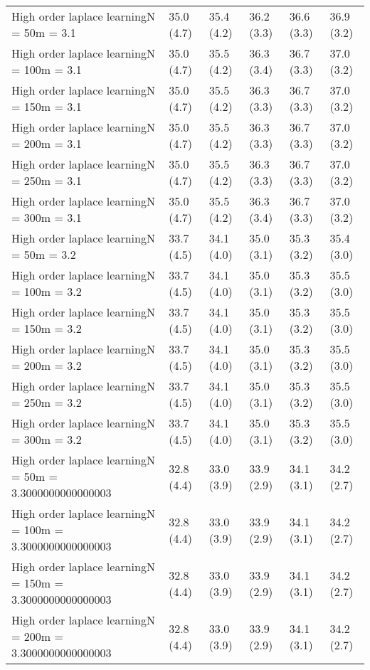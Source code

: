 \documentclass{article}
\begin{document}
\begin{table*}[t!]
\begin{center}
\begin{small}
\begin{sc}
\begin{tabular}{llllll}
High order laplace learningN = 50m = 3.1&35.0 (4.7)      &35.4 (4.2)      &36.2 (3.3)      &36.6 (3.3)      &36.9 (3.2)      \\
High order laplace learningN = 100m = 3.1&35.0 (4.7)      &35.5 (4.2)      &36.3 (3.4)      &36.7 (3.3)      &37.0 (3.2)      \\
High order laplace learningN = 150m = 3.1&35.0 (4.7)      &35.5 (4.2)      &36.3 (3.3)      &36.7 (3.3)      &37.0 (3.2)      \\
High order laplace learningN = 200m = 3.1&35.0 (4.7)      &35.5 (4.2)      &36.3 (3.3)      &36.7 (3.3)      &37.0 (3.2)      \\
High order laplace learningN = 250m = 3.1&35.0 (4.7)      &35.5 (4.2)      &36.3 (3.3)      &36.7 (3.3)      &37.0 (3.2)      \\
High order laplace learningN = 300m = 3.1&35.0 (4.7)      &35.5 (4.2)      &36.3 (3.4)      &36.7 (3.3)      &37.0 (3.2)      \\
High order laplace learningN = 50m = 3.2&33.7 (4.5)      &34.1 (4.0)      &35.0 (3.1)      &35.3 (3.2)      &35.4 (3.0)      \\
High order laplace learningN = 100m = 3.2&33.7 (4.5)      &34.1 (4.0)      &35.0 (3.1)      &35.3 (3.2)      &35.5 (3.0)      \\
High order laplace learningN = 150m = 3.2&33.7 (4.5)      &34.1 (4.0)      &35.0 (3.1)      &35.3 (3.2)      &35.5 (3.0)      \\
High order laplace learningN = 200m = 3.2&33.7 (4.5)      &34.1 (4.0)      &35.0 (3.1)      &35.3 (3.2)      &35.5 (3.0)      \\
High order laplace learningN = 250m = 3.2&33.7 (4.5)      &34.1 (4.0)      &35.0 (3.1)      &35.3 (3.2)      &35.5 (3.0)      \\
High order laplace learningN = 300m = 3.2&33.7 (4.5)      &34.1 (4.0)      &35.0 (3.1)      &35.3 (3.2)      &35.5 (3.0)      \\
High order laplace learningN = 50m = 3.3000000000000003&32.8 (4.4)      &33.0 (3.9)      &33.9 (2.9)      &34.1 (3.1)      &34.2 (2.7)      \\
High order laplace learningN = 100m = 3.3000000000000003&32.8 (4.4)      &33.0 (3.9)      &33.9 (2.9)      &34.1 (3.1)      &34.2 (2.7)      \\
High order laplace learningN = 150m = 3.3000000000000003&32.8 (4.4)      &33.0 (3.9)      &33.9 (2.9)      &34.1 (3.1)      &34.2 (2.7)      \\
High order laplace learningN = 200m = 3.3000000000000003&32.8 (4.4)      &33.0 (3.9)      &33.9 (2.9)      &34.1 (3.1)      &34.2 (2.7)      \\

\end{tabular}
\end{sc}
\end{small}
\end{center}
\end{table*}
\end{document}
